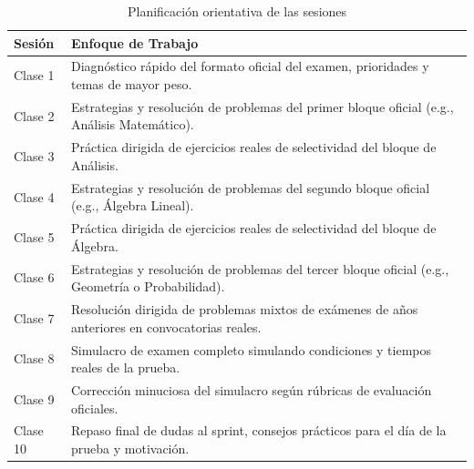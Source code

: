 \documentclass[11pt,a4paper]{article}
\begin{document}
\begin{table}[h]
\centering
\renewcommand{\arraystretch}{1.3}
\begin{tabular}{|l|p{11cm}|}
\hline
\rowcolor{primary}
\color{white}\textbf{Sesión} & \color{white}\textbf{Enfoque de Trabajo} \\ \hline
 Clase 1 & Diagnóstico rápido del formato oficial del examen, prioridades y temas de mayor peso. \\ \hline
 Clase 2 & Estrategias y resolución de problemas del primer bloque oficial (e.g., Análisis Matemático). \\ \hline
 Clase 3 & Práctica dirigida de ejercicios reales de selectividad del bloque de Análisis. \\ \hline
 Clase 4 & Estrategias y resolución de problemas del segundo bloque oficial (e.g., Álgebra Lineal). \\ \hline
 Clase 5 & Práctica dirigida de ejercicios reales de selectividad del bloque de Álgebra. \\ \hline
 Clase 6 & Estrategias y resolución de problemas del tercer bloque oficial (e.g., Geometría o Probabilidad). \\ \hline
 Clase 7 & Resolución dirigida de problemas mixtos de exámenes de años anteriores en convocatorias reales. \\ \hline
 Clase 8 & Simulacro de examen completo simulando condiciones y tiempos reales de la prueba. \\ \hline
 Clase 9 & Corrección minuciosa del simulacro según rúbricas de evaluación oficiales. \\ \hline
 Clase 10 & Repaso final de dudas al sprint, consejos prácticos para el día de la prueba y motivación. \\ \hline
\end{tabular}
\caption{Planificación orientativa de las sesiones}
\end{table}

\newpage
\end{document}
